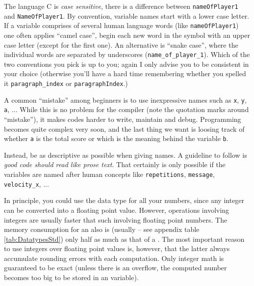 The language C is \emph{case sensitive}, \ie there is a difference between \texttt{nameOfPlayer1} and \texttt{NameOfPlayer1}. By convention, variable names start with a lower case letter. If a variable comprises of several human language words (like \texttt{nameOfPlayer1}) one often applies \enquote{camel case}, \ie begin each new word in the symbol with an upper case letter (except for the first one). An alternative is \enquote{snake case}, where the individual words are separated by underscores (\texttt{name\_of\_player\_1}). Which of the two conventions you pick is up to you; again I only advise you to be consistent in your choice (otherwise you'll have a hard time remembering whether you spelled it \texttt{paragraph\_index} or \texttt{paragraphIndex}.)

\begin{hintbox}
A common \enquote{mistake} among beginners is to use inexpressive names such as \texttt{x}, \texttt{y}, \texttt{a}, ... While this is no problem for the compiler (note the quotation marks around \enquote{mistake}), it makes codes harder to write, maintain and debug. Programming becomes quite complex very soon, and the last thing we want is loosing track of whether \texttt{a} is the total score or which is the meaning behind the variable \texttt{b}.

Instead, be as descriptive as possible when giving names. A guideline to follow is \emph{good code should read like prose text}. That certainly is only possible if the variables are named after human concepts like \texttt{repetitions}, \texttt{message}, \texttt{velocity\_x}, ...
\end{hintbox}

\begin{hintbox}
In principle, you could use the data type  for all your numbers, since any integer can be converted into a floating point value. However, operations involving integers are usually faster that such involving floating point numbers. The memory consumption for an  also is (usually -- see appendix table \ref{tab:DatatypesStd}) only half as much as that of a . The most important reason to use integers over floating point values is, however, that the latter always accumulate rounding errors with each computation. Only integer math is guaranteed to be exact (unless there is an overflow, \ie the computed number becomes too big to be stored in an  variable).
\end{hintbox}

